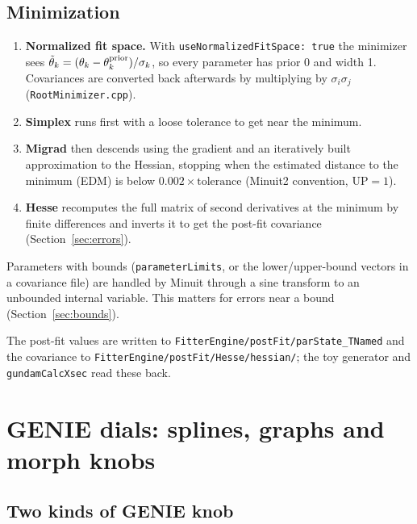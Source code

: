 \documentclass[11pt]{article}
\newcommand{\code}[1]{\texttt{#1}}
\begin{document}
\subsection{Minimization}

\begin{enumerate}
  \item \textbf{Normalized fit space.} With \code{useNormalizedFitSpace: true}
    the minimizer sees $\tilde\theta_k = (\theta_k - \theta^{\rm prior}_k)/\sigma_k$,
    so every parameter has prior 0 and width 1. Covariances are converted back
    afterwards by multiplying by $\sigma_i\sigma_j$
    (\code{RootMinimizer.cpp}).
  \item \textbf{Simplex} runs first with a loose tolerance to get near the
    minimum.
  \item \textbf{Migrad} then descends using the gradient and an iteratively
    built approximation to the Hessian, stopping when the estimated distance to
    the minimum (EDM) is below $0.002 \times \text{tolerance}$ (Minuit2 convention,
    $\text{UP}=1$).
  \item \textbf{Hesse} recomputes the full matrix of second derivatives at the
    minimum by finite differences and inverts it to get the post-fit covariance
    (Section~\ref{sec:errors}).
\end{enumerate}

Parameters with bounds (\code{parameterLimits}, or the lower/upper-bound vectors
in a covariance file) are handled by Minuit through a sine transform to an
unbounded internal variable. This matters for errors near a bound
(Section~\ref{sec:bounds}).

The post-fit values are written to \code{FitterEngine/postFit/parState\_TNamed}
and the covariance to \code{FitterEngine/postFit/Hesse/hessian/}; the toy
generator and \code{gundamCalcXsec} read these back.

\section{GENIE dials: splines, graphs and morph knobs}
\label{sec:dials}

\subsection{Two kinds of GENIE knob}
\end{document}
